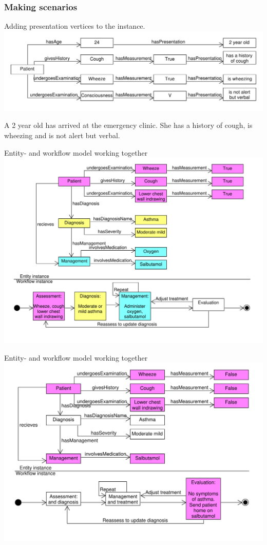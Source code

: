 \documentclass{beamer}
\begin{document}
\begin{frame}[fragile]
\frametitle{Making scenarios}
Adding presentation vertices to the instance.
\includegraphics[scale=0.45]{PresentationEntityGraph}
\begin{semiverbatim}
	A 2 year old has arrived at the 
	emergency clinic.  
	She has a history of cough, 
	is wheezing
	and is not alert but verbal.
\end{semiverbatim}
\end{frame}

\begin{frame}{Entity- and workflow model working together}
\includegraphics[scale=0.40]{Integrated1}
\end{frame}

\begin{frame}{Entity- and workflow model working together	}
\includegraphics[scale=0.45]{Integrated2}
\end{frame}
\end{document}

